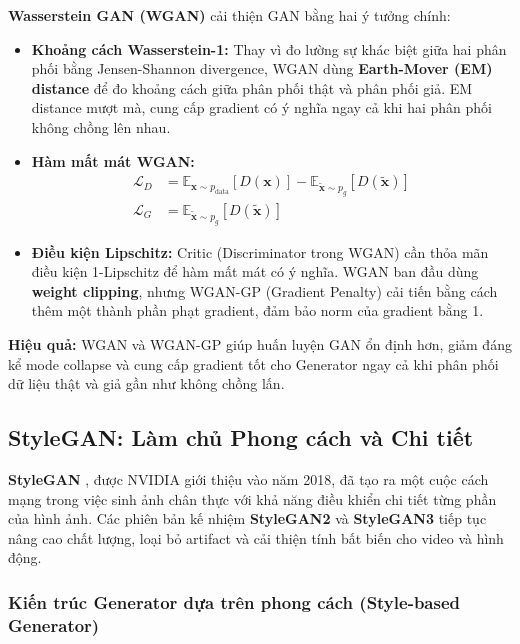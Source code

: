 \textbf{Wasserstein GAN (WGAN)} \cite{Arjovsky2017} cải thiện GAN bằng hai ý tưởng chính:

\begin{itemize}
	\item \textbf{Khoảng cách Wasserstein-1:}  
	Thay vì đo lường sự khác biệt giữa hai phân phối bằng Jensen-Shannon divergence, WGAN dùng \textbf{Earth-Mover (EM) distance} để đo khoảng cách giữa phân phối thật và phân phối giả. EM distance mượt mà, cung cấp gradient có ý nghĩa ngay cả khi hai phân phối không chồng lên nhau.
	
	\item \textbf{Hàm mất mát WGAN:}
	\begin{align}
		\mathcal{L}_D &= \mathbb{E}_{\mathbf{x} \sim p_{\text{data}}} [D(\mathbf{x})] - \mathbb{E}_{\tilde{\mathbf{x}} \sim p_g} [D(\tilde{\mathbf{x}})] \\
		\mathcal{L}_G &= \mathbb{E}_{\tilde{\mathbf{x}} \sim p_g} [D(\tilde{\mathbf{x}})]
	\end{align}
	
	\item \textbf{Điều kiện Lipschitz:}  
	Critic (Discriminator trong WGAN) cần thỏa mãn điều kiện 1-Lipschitz để hàm mất mát có ý nghĩa. WGAN ban đầu dùng \textbf{weight clipping}, nhưng WGAN-GP (Gradient Penalty) cải tiến bằng cách thêm một thành phần phạt gradient, đảm bảo norm của gradient bằng 1.
\end{itemize}

\textbf{Hiệu quả:}  
WGAN và WGAN-GP giúp huấn luyện GAN ổn định hơn, giảm đáng kể mode collapse và cung cấp gradient tốt cho Generator ngay cả khi phân phối dữ liệu thật và giả gần như không chồng lấn.

\subsection{StyleGAN: Làm chủ Phong cách và Chi tiết}
\label{subsec:stylegan}

\textbf{StyleGAN} \cite{Karras2019}, được NVIDIA giới thiệu vào năm 2018, đã tạo ra một cuộc cách mạng trong việc sinh ảnh chân thực với khả năng điều khiển chi tiết từng phần của hình ảnh. Các phiên bản kế nhiệm \textbf{StyleGAN2} và \textbf{StyleGAN3} tiếp tục nâng cao chất lượng, loại bỏ artifact và cải thiện tính bất biến cho video và hình động.

\subsubsection{Kiến trúc Generator dựa trên phong cách (Style-based Generator)}

